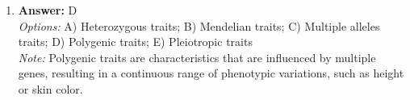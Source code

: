 \documentclass[12pt]{article}
\begin{document}
\begin{enumerate}[label=\arabic*.]
\\ \textit{Note:} The correct answer is supported by the understanding that temperature, precipitation, soil chemistry, and the presence of decomposers are fundamental abiotic and biotic factors that influence the survival, reproduction, and overall characteristics of organisms within an ecosystem.
\item \textbf{Answer:} D
\\ \textit{Options:} A) Heterozygous traits; B) Mendelian traits; C) Multiple alleles traits; D) Polygenic traits; E) Pleiotropic traits
\\ \textit{Note:} Polygenic traits are characteristics that are influenced by multiple genes, resulting in a continuous range of phenotypic variations, such as height or skin color.
\end{enumerate}
\end{document}
